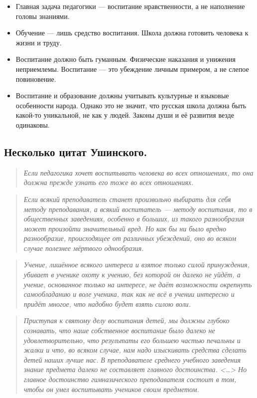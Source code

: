 \begin{itemize}
        \item Главная задача педагогики — воспитание нравственности, а не наполнение головы знаниями. 
    
        \item Обучение — лишь средство воспитания. Школа должна готовить человека к жизни и труду.
    
        \item Воспитание должно быть гуманным. Физические наказания и унижения неприемлемы. Воспитание — это убеждение личным примером, а не слепое повиновение.
    
        \item Воспитание и образование должны учитывать культурные и языковые особенности народа. Однако это не значит, что русская школа должна быть какой-то уникальной, не как у людей. Законы души и её развития везде одинаковы.
\end{itemize}

\subsection*{Несколько цитат Ушинского.}

\begin{quote}
    \textit{Если педагогика хочет воспитывать человека во всех отношениях, то она должна прежде узнать его тоже во всех отношениях.}
\end{quote}

\begin{quote}
    \textit{ Если всякий преподаватель станет произвольно выбирать для себя методу преподавания, а всякий воспитатель — методу воспитания, то в общественных заведениях, особенно в больших, из такого разнообразия может произойти значительный вред. Но как бы ни было вредно разнообразие, происходящее от различных убеждений, оно во всяком случае полезнее мёртвого однообразия.
}\end{quote}

\begin{quote}
    \textit{Учение, лишённое всякого интереса и взятое только силой принуждения, убивает в ученике охоту к учению, без которой он далеко не уйдёт, а учение, основанное только на интересе, не даёт возможности окрепнуть самообладанию и воле ученика, так как не всё в учении интересно и придёт многое, что надобно будет взять силою воли.}
\end{quote}

\begin{quote}
    \textit{Приступая к святому делу воспитания детей, мы должны глубоко сознавать, что наше собственное воспитание было далеко не удовлетворительно, что результаты его большею частью печальны и жалки и что, во всяком случае, нам надо изыскивать средства сделать детей наших лучше нас.
    В преподавателе среднего учебного заведения знание предмета далеко не составляет главного достоинства. <…> Но главное достоинство гимназического преподавателя состоит в том, чтобы он умел воспитывать учеников своим предметом.}
\end{quote}


